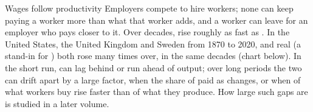 \begin{model}{Wages follow productivity}
\assumes Employers compete to hire workers; none can keep paying a worker more than what that worker
adds, and a worker can leave for an employer who pays closer to it.
\predicts Over decades,  rise roughly as fast as .
\tested In the United States, the United Kingdom and Sweden from 1870 to 2020,  and real
 (a stand-in for ) both rose many times over, in the same decades
(chart below).
\breaks In the short run,  can lag behind or run ahead of output; over long periods the two can
drift apart by a large factor, when the share of  paid as  changes, or when  of
what workers buy rise faster than  of what they produce. How large such gaps are is studied in
a later volume.
\end{model}

